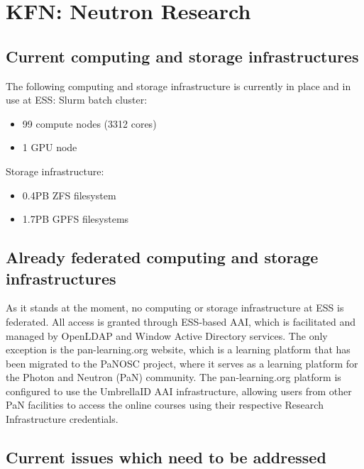 \section{KFN: Neutron Research}


\subsection{Current computing and storage infrastructures}

The following computing and storage infrastructure is currently in place and in use at ESS:
Slurm batch cluster:

\begin{itemize}
  \item 99 compute nodes (3312 cores)
  \item 1 GPU node
\end{itemize}

Storage infrastructure:

\begin{itemize}
  \item 0.4PB ZFS filesystem
  \item 1.7PB GPFS filesystems
\end{itemize}

\subsection{Already federated computing and storage infrastructures}

As it stands at the moment, no computing or storage infrastructure at ESS is federated.
All access is granted through ESS-based AAI, which is facilitated and managed by OpenLDAP and Window Active Directory services.
The only exception is the pan-learning.org website, which is a learning platform that has been migrated to the PaNOSC project, where it serves as a learning platform for the Photon and Neutron (PaN) community.
The pan-learning.org platform is configured to use the UmbrellaID AAI infrastructure, allowing users from other PaN facilities to access the online courses using their respective Research Infrastructure credentials.

\subsection{Current issues which need to be addressed}

